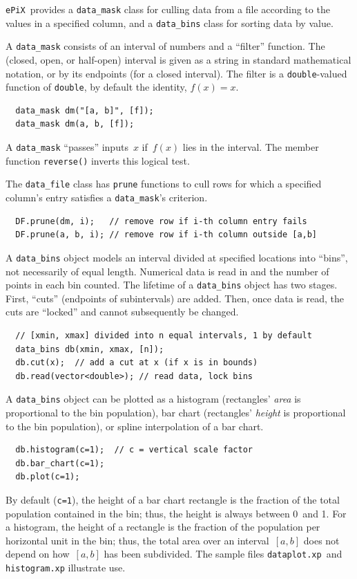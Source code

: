 \documentclass[12pt,letterpaper]{book}
\newcommand{\code}[1]{\texttt{#1}}
\newcommand{\filename}[1]{\texttt{#1}}
\newcommand{\ePiX}{\code{ePiX}}
\newcommand{\teximath}[1]{$#1$}
\newcommand{\findex}[1]{\ignorespaces}
\begin{document}
\ePiX\ provides a \code{data\_mask} class for culling data from a file
according to the values in a specified column, and a \code{data\_bins}
class for sorting data by value.

A \code{data\_mask} consists of an interval of numbers and a
``filter'' function. The (closed, open, or half-open) interval is
given as a string in standard mathematical notation, or by its
endpoints (for a closed interval).  The filter is a
\code{double}-valued function of \code{double}, by default the
identity, \teximath{f(x)=x}.
\findex{data\_mask}
\begin{verbatim}
  data_mask dm("[a, b]", [f]);
  data_mask dm(a, b, [f]);
\end{verbatim}
A \code{data\_mask} ``passes'' inputs~\teximath{x} if~\teximath{f(x)}
lies in the interval. The member function \code{reverse()} inverts
this logical test.

The \code{data\_file} class has \code{prune} functions to cull
rows for which a specified column's entry satisfies a
\code{data\_mask}'s criterion.
\findex{data\_mask.prune}
\begin{verbatim}
  DF.prune(dm, i);   // remove row if i-th column entry fails
  DF.prune(a, b, i); // remove row if i-th column outside [a,b]
\end{verbatim}

A \code{data\_bins} object models an interval divided at specified
locations into ``bins'', not necessarily of equal length. Numerical
data is read in and the number of points in each bin counted. The
lifetime of a \code{data\_bins} object has two stages. First, ``cuts''
(endpoints of subintervals) are added. Then, once data is read, the
cuts are ``locked'' and cannot subsequently be changed.
\findex{data\_bins}
\findex{data\_bins.cut}
\findex{data\_bins.read}
\begin{verbatim}
  // [xmin, xmax] divided into n equal intervals, 1 by default
  data_bins db(xmin, xmax, [n]);
  db.cut(x);  // add a cut at x (if x is in bounds)
  db.read(vector<double>); // read data, lock bins
\end{verbatim}

A \code{data\_bins} object can be plotted as a histogram (rectangles'
\emph{area} is proportional to the bin population), bar chart
(rectangles' \emph{height} is proportional to the bin population), or
spline interpolation of a bar chart.
\findex{data\_bins.histogram}
\findex{data\_bins.bar\_chart}
\findex{data\_bins.plot}
\begin{verbatim}
  db.histogram(c=1);  // c = vertical scale factor
  db.bar_chart(c=1);
  db.plot(c=1);
\end{verbatim}
By default (\code{c=1}), the height of a bar chart rectangle is the
fraction of the total population contained in the bin; thus, the
height is always between 0~and 1. For a histogram, the height of a
rectangle is the fraction of the population per horizontal unit in the
bin; thus, the total area over an interval~\teximath{[a,b]} does not
depend on how~\teximath{[a,b]} has been subdivided. The sample files
\filename{dataplot.xp}~and \filename{histogram.xp} illustrate use.
\end{document}
